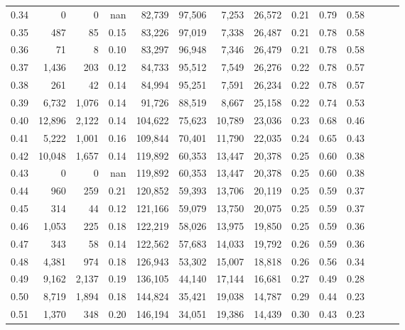 \begin{tabular}{rrrrrrrrrrrrrr}
0.34 &       0 &      0 &   nan &   82,739 &   97,506 &   7,253 &  26,572 &  0.21 &  0.79 &      0.58 \\
0.35 &     487 &     85 &  0.15 &   83,226 &   97,019 &   7,338 &  26,487 &  0.21 &  0.78 &      0.58 \\
0.36 &      71 &      8 &  0.10 &   83,297 &   96,948 &   7,346 &  26,479 &  0.21 &  0.78 &      0.58 \\
0.37 &   1,436 &    203 &  0.12 &   84,733 &   95,512 &   7,549 &  26,276 &  0.22 &  0.78 &      0.57 \\
0.38 &     261 &     42 &  0.14 &   84,994 &   95,251 &   7,591 &  26,234 &  0.22 &  0.78 &      0.57 \\
0.39 &   6,732 &  1,076 &  0.14 &   91,726 &   88,519 &   8,667 &  25,158 &  0.22 &  0.74 &      0.53 \\
0.40 &  12,896 &  2,122 &  0.14 &  104,622 &   75,623 &  10,789 &  23,036 &  0.23 &  0.68 &      0.46 \\
0.41 &   5,222 &  1,001 &  0.16 &  109,844 &   70,401 &  11,790 &  22,035 &  0.24 &  0.65 &      0.43 \\
0.42 &  10,048 &  1,657 &  0.14 &  119,892 &   60,353 &  13,447 &  20,378 &  0.25 &  0.60 &      0.38 \\
0.43 &       0 &      0 &   nan &  119,892 &   60,353 &  13,447 &  20,378 &  0.25 &  0.60 &      0.38 \\
0.44 &     960 &    259 &  0.21 &  120,852 &   59,393 &  13,706 &  20,119 &  0.25 &  0.59 &      0.37 \\
0.45 &     314 &     44 &  0.12 &  121,166 &   59,079 &  13,750 &  20,075 &  0.25 &  0.59 &      0.37 \\
0.46 &   1,053 &    225 &  0.18 &  122,219 &   58,026 &  13,975 &  19,850 &  0.25 &  0.59 &      0.36 \\
0.47 &     343 &     58 &  0.14 &  122,562 &   57,683 &  14,033 &  19,792 &  0.26 &  0.59 &      0.36 \\
0.48 &   4,381 &    974 &  0.18 &  126,943 &   53,302 &  15,007 &  18,818 &  0.26 &  0.56 &      0.34 \\
0.49 &   9,162 &  2,137 &  0.19 &  136,105 &   44,140 &  17,144 &  16,681 &  0.27 &  0.49 &      0.28 \\
0.50 &   8,719 &  1,894 &  0.18 &  144,824 &   35,421 &  19,038 &  14,787 &  0.29 &  0.44 &      0.23 \\
0.51 &   1,370 &    348 &  0.20 &  146,194 &   34,051 &  19,386 &  14,439 &  0.30 &  0.43 &      0.23 \\

\end{tabular}
